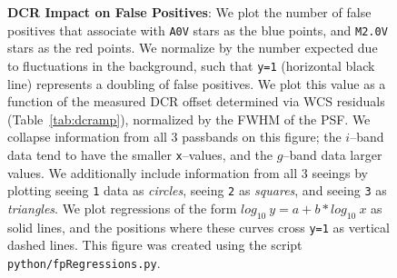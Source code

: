 \documentclass[DM,toc]{lsstdoc}
\begin{document}
\begin{figure}[!ht]
  \centering
   \\
   \\
  \caption{{\bf DCR Impact on False Positives}: We plot the number of
    false positives that associate with {\tt A0V} stars as the blue
    points, and {\tt M2.0V} stars as the red points.  We normalize by
    the number expected due to fluctuations in the background, such
    that {\tt y=1} (horizontal black line) represents a doubling of
    false positives.  We plot this value as a function of the measured
    DCR offset determined via WCS residuals (Table~\ref{tab:dcramp}),
    normalized by the FWHM of the PSF.  We collapse information from
    all 3 passbands on this figure; the $i$--band data tend to have
    the smaller {\tt x}--values, and the $g$--band data larger values.
    We additionally include information from all 3 seeings by plotting
    seeing {\tt 1} data as {\it circles}, seeing {\tt 2} as {\it
      squares}, and seeing {\tt 3} as {\it triangles}.  We plot
    regressions of the form $log_{10}~y = a + b * log_{10}~x$ as solid
    lines, and the positions where these curves cross {\tt y=1} as
    vertical dashed lines.  This figure was created using the script
    {\tt python/fpRegressions.py}.}
  \label{fig:fpregress}
\end{figure}
\end{document}
